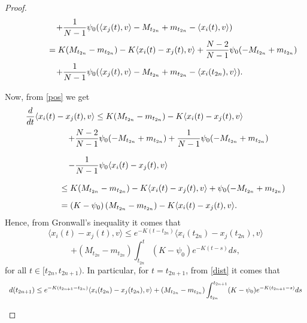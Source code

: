 \documentclass[a4paper,11pt,oneside]{article}
\begin{document}
\begin{proof}
$$\begin{array}{l}
			\vspace{0.2cm}\displaystyle{\hspace{1.8 cm}+\frac{1}{N-1}\psi_{0}(\langle x_{j}(t),v\rangle-M_{t_{2n}}+m_{t_{2n}}-\langle x_{i}(t),v\rangle)}\\
			\vspace{0.2cm}\displaystyle{\hspace{1.5 cm}=K(M_{t_{2n}}-m_{t_{2n}})-K\langle x_{i}(t)-x_{j}(t),v\rangle+\frac{N-2}{N-1}\psi_{0}(-M_{t_{2n}}+m_{t_{2n}})}\\
			\vspace{0.2cm}\displaystyle{\hspace{1.8 cm}+\frac{1}{N-1}\psi_{0}(\langle x_{j}(t),v\rangle-M_{t_{2n}}+m_{t_{2n}}-\langle x_{i}(t_{2n}),v\rangle)}.
		\end{array}
		$$
		Now, from \eqref{pos} we get
		$$\begin{array}{l}
			\vspace{0.2cm}\displaystyle{
				\frac{d}{dt}\langle x_{i}(t)-x_{j}(t),v\rangle\leq K(M_{t_{2n}}-m_{t_{2n}})-K\langle x_{i}(t)-x_{j}(t),v\rangle
			}\\
			\vspace{0.4 cm}\displaystyle{\hspace{1.8 cm}
				+\frac{N-2}{N-1}\psi_{0}(-M_{t_{2n}}+m_{t_{2n}})+\frac{1}{N-1}\psi_{0}(-M_{t_{2n}}+m_{t_{2n}})
			}\\
			\vspace{0.4 cm}\displaystyle{\hspace{1.8 cm}
				-\frac{1}{N-1}\psi_{0}\langle x_{i}(t)-x_{j}(t),v\rangle
			}\\
			\vspace{0.3 cm}\displaystyle{\hspace{1.5 cm}\leq K(M_{t_{2n}}-m_{t_{2n}})-K\langle x_{i}(t)-x_{j}(t),v\rangle+\psi_{0}(-M_{t_{2n}}+m_{t_{2n}})
			}\\
			\displaystyle{\hspace{1.5 cm}=\left(K-\psi_{0}\right)(M_{t_{2n}}-m_{t_{2n}})-K\langle x_{i}(t)-x_{j}(t),v\rangle.}
		\end{array}$$
		Hence, from Gronwall's inequality it comes that $$\langle x_{i}(t)-x_{j}(t),v\rangle \leq e^{-K(t-t_{2n})}\langle x_{i}(t_{2n})-x_{j}(t_{2n}),v\rangle$$$$+(M_{t_{2n}}-m_{t_{2n}})\int_{t_{2n}}^{t}\left(K-\psi_{0}\right)e^{-K(t-s)}ds,$$
		for all $t\in [t_{2n},t_{2n+1})$. In particular, for $t= t_{2n+1}$, from \eqref{dist} it comes that 
		$$\begin{array}{l}
			\vspace{0.2cm}\displaystyle{d(t_{2n+1})\leq e^{-K(t_{2n+1}-t_{2n})}\langle x_{i}(t_{2n})-x_{j}(t_{2n}),v\rangle+(M_{t_{2n}}-m_{t_{2n}})\int_{t_{2n}}^{t_{2n+1}}(K-\psi_{0})e^{-K(t_{2n+1}-s)}ds}\\

\end{array}$$
\end{proof}
\end{document}
